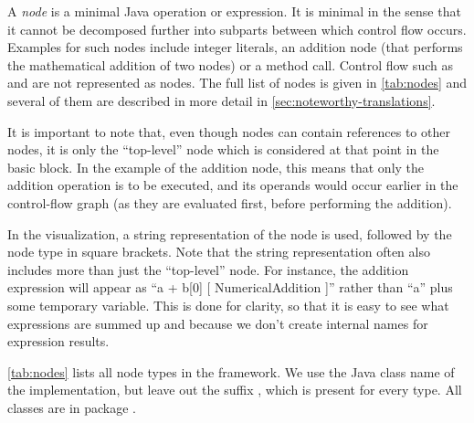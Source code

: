 \begin{definition}[Nodes]
    \label{def:node}
    A \emph{node} is a minimal Java operation or expression.  It is
    minimal in the sense that it cannot be decomposed further into
    subparts between which control flow occurs. Examples for such
    nodes include integer literals, an addition node (that performs
    the mathematical addition of two nodes) or a method call.  Control
    flow such as  and  are not represented as
    nodes.  The full list of nodes is given in \autoref{tab:nodes} and
    several of them are described in more detail in
    \autoref{sec:noteworthy-translations}.

    It is important to note that, even though nodes can contain
    references to other nodes, it is only the ``top-level'' node which
    is considered at that point in the basic block. In the example of
    the addition node, this means that only the addition operation is
    to be executed, and its operands would occur earlier in the
    control-flow graph (as they are evaluated first, before performing
    the addition).
\end{definition}

In the visualization, a string representation of the node is used,
followed by the node type in square brackets. Note that the string
representation often also includes more than just the ``top-level''
node. For instance, the addition expression  will
appear as ``a + b[0] [ NumericalAddition ]'' rather than ``a'' plus
some temporary variable.  This is done for clarity, so that it is easy
to see what expressions are summed up and because we don't create
internal names for expression results.

\autoref{tab:nodes} lists all node types in the framework. We use the
Java class name of the implementation, but leave out the suffix
, which is present for every type.
All classes are in package .

